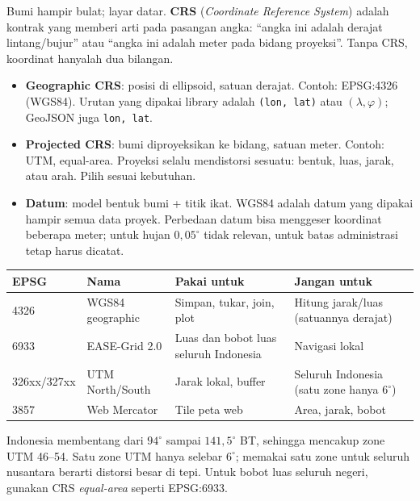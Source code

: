 \documentclass[9pt,a4paper]{extarticle}
\newcommand{\code}[1]{\texttt{\small\color{ink}#1}}
\newcommand{\thead}[1]{\textbf{\color{ink}#1}}
\begin{document}
Bumi hampir bulat; layar datar. \textbf{CRS} (\emph{Coordinate Reference System}) adalah kontrak yang memberi arti pada pasangan angka: ``angka ini adalah derajat lintang/bujur'' atau ``angka ini adalah meter pada bidang proyeksi''. Tanpa CRS, koordinat hanyalah dua bilangan.

\begin{itemize}[leftmargin=1.2em,itemsep=0.5pt,topsep=1pt]
  \item \textbf{Geographic CRS}: posisi di ellipsoid, satuan derajat. Contoh: EPSG:4326 (WGS84). Urutan yang dipakai library adalah \code{(lon, lat)} atau $(\lambda,\varphi)$; GeoJSON juga \code{lon, lat}.
  \item \textbf{Projected CRS}: bumi diproyeksikan ke bidang, satuan meter. Contoh: UTM, equal-area. Proyeksi selalu mendistorsi sesuatu: bentuk, luas, jarak, atau arah. Pilih sesuai kebutuhan.
  \item \textbf{Datum}: model bentuk bumi + titik ikat. WGS84 adalah datum yang dipakai hampir semua data proyek. Perbedaan datum bisa menggeser koordinat beberapa meter; untuk hujan $0{,}05^\circ$ tidak relevan, untuk batas administrasi tetap harus dicatat.
\end{itemize}

\begin{center}
\footnotesize
\begin{tabularx}{\linewidth}{@{}p{1.35cm}>{\RaggedRight\arraybackslash}p{3.3cm}>{\RaggedRight\arraybackslash}X>{\RaggedRight\arraybackslash}p{4.0cm}@{}}
\toprule
\rowcolor{bg}\thead{EPSG} & \thead{Nama} & \thead{Pakai untuk} & \thead{Jangan untuk}\\
\midrule
4326 & WGS84 geographic & Simpan, tukar, join, plot & Hitung jarak/luas (satuannya derajat)\\
6933 & EASE-Grid 2.0 & Luas dan bobot luas seluruh Indonesia & Navigasi lokal\\
326xx/327xx & UTM North/South & Jarak lokal, buffer & Seluruh Indonesia (satu zone hanya $6^\circ$)\\
3857 & Web Mercator & Tile peta web & Area, jarak, bobot\\
\bottomrule
\end{tabularx}
\end{center}

Indonesia membentang dari $94^\circ$ sampai $141{,}5^\circ$ BT, sehingga mencakup zone UTM 46--54. Satu zone UTM hanya selebar $6^\circ$; memakai satu zone untuk seluruh nusantara berarti distorsi besar di tepi. Untuk bobot luas seluruh negeri, gunakan CRS \emph{equal-area} seperti EPSG:6933.
\end{document}
